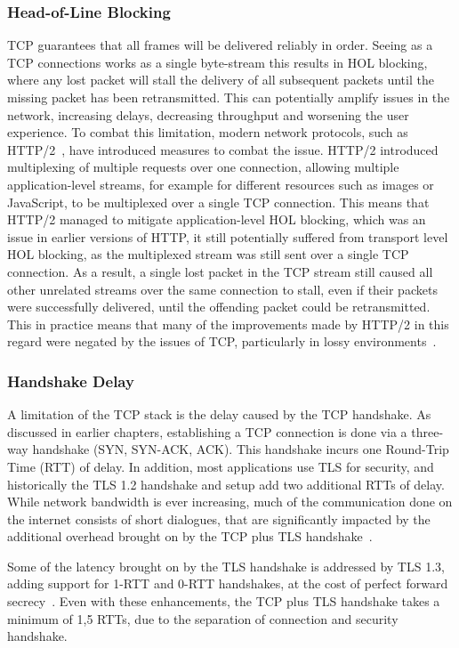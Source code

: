 \documentclass[english, 12pt, a4paper, elec, utf8, a-2b, online]{aaltothesis}
\begin{document}
\subsubsection{Head-of-Line Blocking}
\label{sec:hol}
TCP guarantees that all frames will be delivered reliably in order. Seeing
as a TCP connections works as a single byte-stream this results in HOL blocking,
where any lost packet will stall the delivery of
all subsequent packets until the missing packet has been retransmitted. This
can potentially amplify issues in the network, increasing delays, decreasing
throughput and worsening the user experience. To combat this limitation, modern
network protocols, such as HTTP/2~\cite{rfc9113}, have introduced measures to
combat the issue. HTTP/2 introduced multiplexing of multiple requests over one
connection, allowing multiple application-level streams, for example for different
resources such as images or JavaScript, to be multiplexed over a single TCP
connection. This means that HTTP/2 managed to mitigate application-level HOL
blocking, which was an issue in earlier versions of HTTP, it still potentially
suffered from transport level HOL blocking, as the multiplexed stream was still
sent over a single TCP connection. As a result, a single lost packet in the TCP
stream still caused all other unrelated streams over the same connection to stall,
even if their packets were successfully delivered, until the offending packet
could be retransmitted. This in practice means that many of the improvements made
by HTTP/2 in this regard were negated by the issues of TCP, particularly in lossy
environments~\cite{http2_vs_1}.

\subsubsection{Handshake Delay}
A limitation of the TCP stack is the delay caused by the TCP handshake. As discussed
in earlier chapters, establishing a TCP connection is done via a three-way handshake
(SYN, SYN-ACK, ACK). This handshake incurs one Round-Trip Time (RTT) of delay. In
addition, most applications use TLS for security, and historically the TLS 1.2 handshake
and setup add two additional RTTs of delay. While network bandwidth is ever increasing,
much of the communication done on the internet consists of short dialogues, that
are significantly impacted by the additional overhead brought on by the TCP plus TLS
handshake~\cite{quic_transport_protocol_design}.

Some of the latency brought on by the TLS handshake is addressed by TLS 1.3, adding
support for 1-RTT and 0-RTT handshakes, at the cost of perfect forward secrecy~\cite{rfc8446}. Even with
these enhancements, the TCP plus TLS handshake takes a minimum of 1,5 RTTs, due to the separation
of connection and security handshake.
\end{document}
